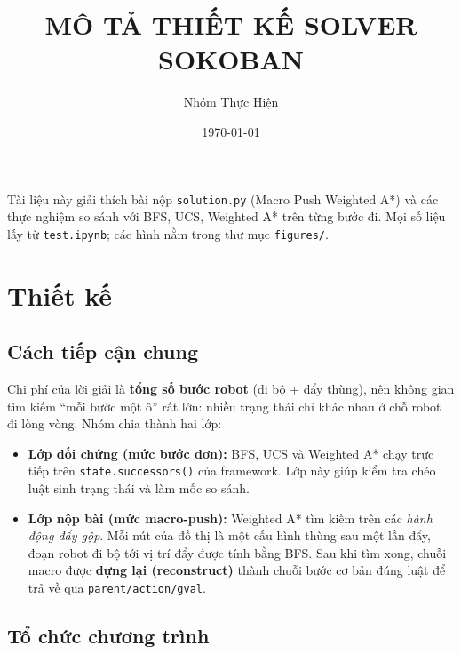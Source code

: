 \documentclass[a4paper,12pt]{article}
\title{\textbf{MÔ TẢ THIẾT KẾ SOLVER SOKOBAN}}
\author{Nhóm Thực Hiện}
\date{\today}
\begin{document}
\maketitle

\tableofcontents
\listoffigures
\listoftables
\newpage

\noindent Tài liệu này giải thích bài nộp \texttt{solution.py} (Macro Push Weighted A*) và các thực nghiệm so sánh với BFS, UCS, Weighted A* trên từng bước đi. Mọi số liệu lấy từ \texttt{test.ipynb}; các hình nằm trong thư mục \texttt{figures/}.

\section{Thiết kế}

\subsection{Cách tiếp cận chung}

Chi phí của lời giải là \textbf{tổng số bước robot} (đi bộ + đẩy thùng), nên không gian tìm kiếm ``mỗi bước một ô'' rất lớn: nhiều trạng thái chỉ khác nhau ở chỗ robot đi lòng vòng. Nhóm chia thành hai lớp:

\begin{itemize}
    \item \textbf{Lớp đối chứng (mức bước đơn):} BFS, UCS và Weighted A* chạy trực tiếp trên \texttt{state.successors()} của framework. Lớp này giúp kiểm tra chéo luật sinh trạng thái và làm mốc so sánh.
    \item \textbf{Lớp nộp bài (mức macro-push):} Weighted A* tìm kiếm trên các \textit{hành động đẩy gộp}. Mỗi nút của đồ thị là một cấu hình thùng sau một lần đẩy, đoạn robot đi bộ tới vị trí đẩy được tính bằng BFS. Sau khi tìm xong, chuỗi macro được \textbf{dựng lại (reconstruct)} thành chuỗi bước cơ bản đúng luật để trả về qua \texttt{parent/action/gval}.
\end{itemize}

\subsection{Tổ chức chương trình}
\end{document}
